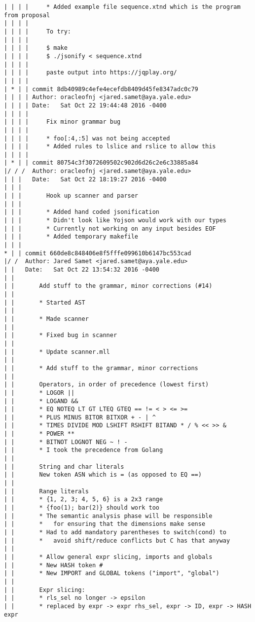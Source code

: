 \begin{lstlisting}
| | | |     * Added example file sequence.xtnd which is the program from proposal
| | | |     
| | | |     To try:
| | | |     
| | | |     $ make
| | | |     $ ./jsonify < sequence.xtnd
| | | |     
| | | |     paste output into https://jqplay.org/
| | | |     
| * | | commit 8db40989c4efe4ecefdb8409d45fe8347adc0c79
| | | | Author: oracleofnj <jared.samet@aya.yale.edu>
| | | | Date:   Sat Oct 22 19:44:48 2016 -0400
| | | | 
| | | |     Fix minor grammar bug
| | | |     
| | | |     * foo[:4,:5] was not being accepted
| | | |     * Added rules to lslice and rslice to allow this
| | | |     
| * | | commit 80754c3f3072609502c902d6d26c2e6c33885a84
|/ / /  Author: oracleofnj <jared.samet@aya.yale.edu>
| | |   Date:   Sat Oct 22 18:19:27 2016 -0400
| | |   
| | |       Hook up scanner and parser
| | |       
| | |       * Added hand coded jsonification
| | |       * Didn't look like Yojson would work with our types
| | |       * Currently not working on any input besides EOF
| | |       * Added temporary makefile
| | |    
* | | commit 660de8c848406e8f5fffe099610b6147bc553cad
|/ /  Author: Jared Samet <jared.samet@aya.yale.edu>
| |   Date:   Sat Oct 22 13:54:32 2016 -0400
| |   
| |       Add stuff to the grammar, minor corrections (#14)
| |       
| |       * Started AST
| |       
| |       * Made scanner
| |       
| |       * Fixed bug in scanner
| |       
| |       * Update scanner.mll
| |       
| |       * Add stuff to the grammar, minor corrections
| |       
| |       Operators, in order of precedence (lowest first)
| |       * LOGOR ||
| |       * LOGAND &&
| |       * EQ NOTEQ LT GT LTEQ GTEQ == != < > <= >=
| |       * PLUS MINUS BITOR BITXOR + - | ^
| |       * TIMES DIVIDE MOD LSHIFT RSHIFT BITAND * / % << >> &
| |       * POWER **
| |       * BITNOT LOGNOT NEG ~ ! -
| |       * I took the precedence from Golang
| |       
| |       String and char literals
| |       New token ASN which is = (as opposed to EQ ==)
| |       
| |       Range literals
| |       * {1, 2, 3; 4, 5, 6} is a 2x3 range
| |       * {foo(1); bar(2)} should work too
| |       * The semantic analysis phase will be responsible
| |       *   for ensuring that the dimensions make sense
| |       * Had to add mandatory parentheses to switch(cond) to
| |       *   avoid shift/reduce conflicts but C has that anyway
| |       
| |       * Allow general expr slicing, imports and globals
| |       * New HASH token #
| |       * New IMPORT and GLOBAL tokens ("import", "global")
| |       
| |       Expr slicing:
| |       * rls_sel no longer -> epsilon
| |       * replaced by expr -> expr rhs_sel, expr -> ID, expr -> HASH expr

\end{lstlisting}
